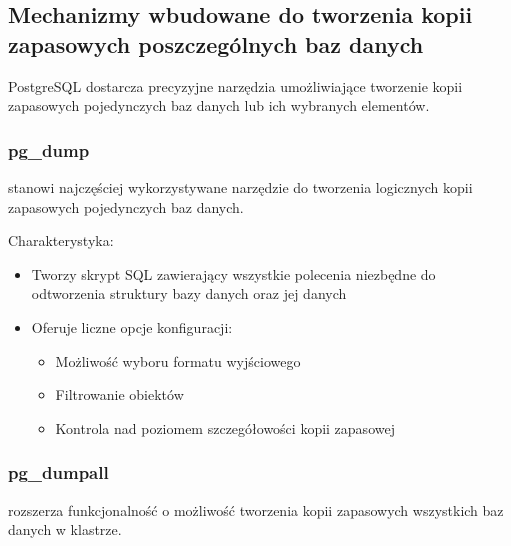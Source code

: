 \documentclass[a4paper,11pt,openany,english]{sphinxmanual}
\begin{document}
\subsection{Mechanizmy wbudowane do tworzenia kopii zapasowych poszczególnych baz danych}
\label{\detokenize{rozdzial2/Kopie_zapasowe_i_odzyskiwanie_danych/kopie_zapasowe_i_odzyskiwanie_danych:mechanizmy-wbudowane-do-tworzenia-kopii-zapasowych-poszczegolnych-baz-danych}}
\sphinxAtStartPar
PostgreSQL dostarcza precyzyjne narzędzia umożliwiające tworzenie kopii zapasowych pojedynczych baz danych lub ich wybranych elementów.


\subsubsection{pg\_dump}
\label{\detokenize{rozdzial2/Kopie_zapasowe_i_odzyskiwanie_danych/kopie_zapasowe_i_odzyskiwanie_danych:pg-dump}}
\sphinxAtStartPar
{} stanowi najczęściej wykorzystywane narzędzie do tworzenia logicznych kopii zapasowych pojedynczych baz danych.

\sphinxAtStartPar
Charakterystyka:
\begin{itemize}
\item {} 
\sphinxAtStartPar
Tworzy skrypt SQL zawierający wszystkie polecenia niezbędne do odtworzenia struktury bazy danych oraz jej danych

\item {} 
\sphinxAtStartPar
Oferuje liczne opcje konfiguracji:
\begin{itemize}
\item {} 
\sphinxAtStartPar
Możliwość wyboru formatu wyjściowego

\item {} 
\sphinxAtStartPar
Filtrowanie obiektów

\item {} 
\sphinxAtStartPar
Kontrola nad poziomem szczegółowości kopii zapasowej

\end{itemize}

\end{itemize}


\subsubsection{pg\_dumpall}
\label{\detokenize{rozdzial2/Kopie_zapasowe_i_odzyskiwanie_danych/kopie_zapasowe_i_odzyskiwanie_danych:pg-dumpall}}
\sphinxAtStartPar
{} rozszerza funkcjonalność  o możliwość tworzenia kopii zapasowych wszystkich baz danych w klastrze.
\end{document}
